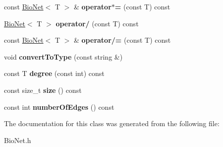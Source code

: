 \begin{DoxyCompactItemize}
\item 
\mbox{\label{class_bio_net_af29d2f7582b887fa98884a0107f7e6b0}} 
const \hyperlink{class_bio_net}{Bio\+Net}$<$ T $>$ \& {\bfseries operator$\ast$=} (const T) const
\item 
\mbox{\label{class_bio_net_a985192f23c7b5e209d191a47b9aab9e2}} 
\hyperlink{class_bio_net}{Bio\+Net}$<$ T $>$ {\bfseries operator/} (const T) const
\item 
\mbox{\label{class_bio_net_a2367e25a99097d4704d86ad34a4af8df}} 
const \hyperlink{class_bio_net}{Bio\+Net}$<$ T $>$ \& {\bfseries operator/=} (const T) const
\item 
\mbox{\label{class_bio_net_a7eb4a3c1731c8883a8f34762f51d4951}} 
void {\bfseries convert\+To\+Type} (const string \&)
\item 
\mbox{\label{class_bio_net_a551ed339a1ee3cf82d39e29db72fbcbe}} 
const T {\bfseries degree} (const int) const
\item 
\mbox{\label{class_bio_net_ab8b612b8dd76b0e7930ea65aff1726b4}} 
const size\+\_\+t {\bfseries size} () const
\item 
\mbox{\label{class_bio_net_a91bb601d635f33d199f267f37853e9e5}} 
const int {\bfseries number\+Of\+Edges} () const
\end{DoxyCompactItemize}


The documentation for this class was generated from the following file\+:\begin{DoxyCompactItemize}
\item 
Bio\+Net.\+h\end{DoxyCompactItemize}
